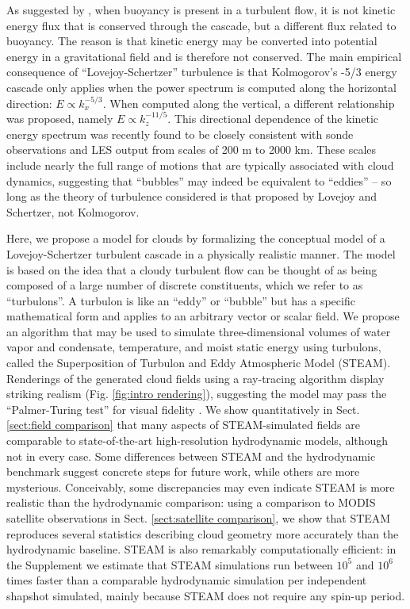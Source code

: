 \documentclass[acp, manuscript, english]{copernicus}
\begin{document}
As suggested by \citet{schertzer1985}, when buoyancy is present in a turbulent flow, it is not kinetic energy flux that is conserved through the cascade, but a different flux related to buoyancy. The reason is that kinetic energy may be converted into potential energy in a gravitational field and is therefore not conserved. The main empirical consequence of ``Lovejoy-Schertzer'' turbulence is that Kolmogorov's -5/3 energy cascade only applies when the power spectrum is computed along the horizontal direction: $E\propto k_x^{-5/3}$. When computed along the vertical, a different relationship was proposed, namely $E\propto k_z^{-11/5}$. This directional dependence of the kinetic energy spectrum was recently found to be closely consistent with sonde observations and LES output from scales of 200 m to 2000 km. These scales include nearly the full range of motions that are typically associated with cloud dynamics, suggesting that ``bubbles'' may indeed be equivalent to ``eddies'' -- so long as the theory of turbulence considered is that proposed by Lovejoy and Schertzer, not Kolmogorov.

Here, we propose a model for clouds by formalizing the conceptual model of a Lovejoy-Schertzer turbulent cascade in a physically realistic manner. The model is based on the idea that a cloudy turbulent flow can be thought of as being composed of a large number of discrete constituents, which we refer to as ``turbulons''. A turbulon is like an ``eddy'' or ``bubble'' but has a specific mathematical form and applies to an arbitrary vector or scalar field. We propose an algorithm that may be used to simulate three-dimensional volumes of water vapor and condensate, temperature, and moist static energy using turbulons, called the Superposition of Turbulon and Eddy Atmospheric Model (STEAM). Renderings of the generated cloud fields using a ray-tracing algorithm display striking realism (Fig. \ref{fig:intro rendering}), suggesting the model may pass the ``Palmer-Turing test'' for visual fidelity \citep{palmer2016,christensen2021}. We show quantitatively in Sect. \ref{sect:field comparison} that many aspects of STEAM-simulated fields are comparable to state-of-the-art high-resolution hydrodynamic models, although not in every case. Some differences between STEAM and the hydrodynamic benchmark suggest concrete steps for future work, while others are more mysterious. Conceivably, some discrepancies may even indicate STEAM is more realistic than the hydrodynamic comparison: using a comparison to MODIS satellite observations in Sect. \ref{sect:satellite comparison}, we show that STEAM reproduces several statistics describing cloud geometry more accurately than the hydrodynamic baseline. STEAM is also remarkably computationally efficient: in the Supplement we estimate that STEAM simulations run between $10^5$ and $10^6$ times faster than a comparable hydrodynamic simulation per independent shapshot simulated, mainly because STEAM does not require any spin-up period.
\end{document}
